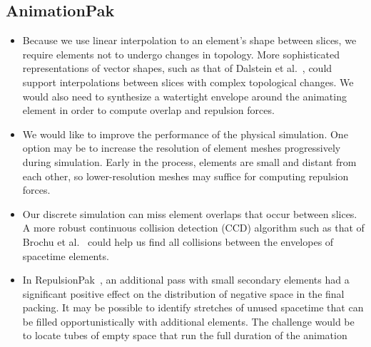 \subsection{AnimationPak}


\begin{itemize}
\item {}
Because we use linear interpolation to  an element's shape
	between slices, we require elements not to undergo changes in 
	topology.  More sophisticated representations of vector shapes,
	such as that of Dalstein et al.~\cite{Dalstein2015}, could support
	interpolations between slices with complex topological changes.
	We would also need to synthesize a watertight envelope around the
	animating element in order to compute overlap and repulsion forces.

\item {}
We would like to improve the performance of the physical simulation.
	One option may be to increase the resolution of element meshes 
	progressively during simulation.  Early in the process, elements are
	small and distant from each other, so lower-resolution
	meshes may suffice for computing repulsion forces.

\item {}
	Our discrete simulation can miss element overlaps that occur between
	slices.  A more robust continuous collision detection (CCD) algorithm
	such as that of Brochu et al.~\cite{Brochu2012}
	could help us find all collisions between
	the envelopes of spacetime elements.

\item {}
In RepulsionPak~\cite{Saputra2018}, an additional pass with
	small secondary elements had a significant positive effect on the
	distribution of negative space in the final packing.  It may be
	possible to identify stretches of unused spacetime that can be filled
	opportunistically with additional elements.  The challenge would be
	to locate tubes of empty space that run the full duration of the animation


\end{itemize}
